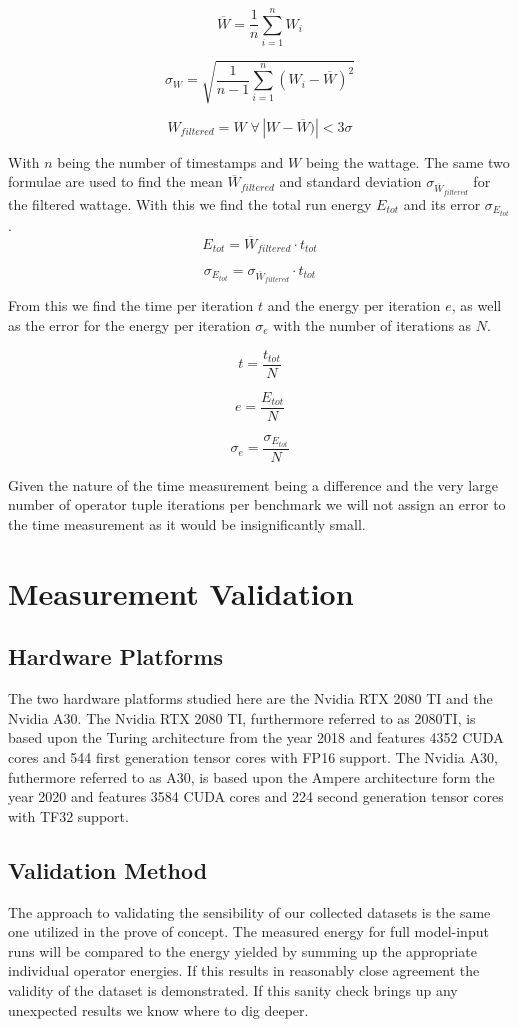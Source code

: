 \documentclass[conference]{IEEEtran}
\begin{document}
\[
\overline{W} = \frac{1}{n} \sum_{i=1}^{n} W_i
\]

\[
\sigma_W = \sqrt{\frac{1}{n - 1} \sum_{i=1}^{n} (W_i - \overline{W})^2}
\]


\[
W_{filtered} = W \; \forall \, |W - \overline{W})| < 3 \sigma
\]

With $n$ being the number of timestamps and $W$ being the wattage. The same two formulae are used to find the mean $ \overline{W}_{filtered}$ and standard deviation $\sigma_{\overline{W}_{filtered}}$ for the filtered wattage. With this we find the total run energy $ E_{tot}$ and its error $\sigma_{E_{tot}}$.
 \[
 E_{tot} = \overline{W}_{filtered} \cdot t_{tot}
 \]

  \[
 \sigma_{E_{tot}} = \sigma_{\overline{W}_{filtered}} \cdot t_{tot}
 \]

From this we find the time per iteration $t$ and the energy per iteration $e$, as well as the error for the energy per iteration $\sigma_e$ with the number of iterations as $N$.

\[
t = \frac{t_{tot}}{N}
\]


\[
e = \frac{E_{tot}}{N}
\]

\[
\sigma_e = \frac{\sigma_{E_{tot}}}{N}
\]

Given the nature of the time measurement being a difference and the very large number of operator tuple iterations per benchmark we will not assign an error to the time measurement as it would be insignificantly small.

\section{Measurement Validation}

\subsection{Hardware Platforms}
The two hardware platforms studied here are the Nvidia RTX 2080 TI and the Nvidia A30. The Nvidia RTX 2080 TI, furthermore referred to as 2080TI, is based upon the Turing architecture from the year 2018 and features 4352 CUDA cores and 544 first generation tensor cores with FP16 support. The Nvidia A30, futhermore referred to as A30, is based upon the Ampere architecture form the year 2020 and features 3584 CUDA cores and 224 second generation tensor cores with TF32 support.\\

\subsection{Validation Method}
The approach to validating the sensibility of our collected datasets is the same one utilized in the prove of concept. The measured energy for full model-input runs will be compared to the energy yielded by summing up the appropriate individual operator energies. If this results in reasonably close agreement the validity of the dataset is demonstrated. If this sanity check brings up any unexpected results we know where to dig deeper.
\end{document}
